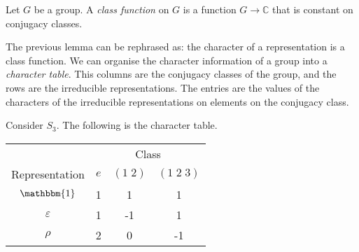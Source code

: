 \begin{definition}
    Let $G$ be a group. A \emph{class function} on $G$ is a function $G \to \mathbb C$ that is constant on conjugacy classes.
\end{definition}

The previous lemma can be rephrased as: the character of a representation is a class function. We can organise the character information of a group into a \emph{character table}. This columns are the conjugacy classes of the group, and the rows are the irreducible representations. The entries are the values of the characters of the irreducible representations on elements on the conjugacy class.

\begin{example}
    Consider $S_3$. The following is the character table.
    \begin{center}
        \begin{tabular}{cccc}
            \toprule
                           & \multicolumn{3}{c}{Class}                          \\
            \cmidrule{2-4}
            Representation & $e$                       & $(1\;2)$ & $(1\;2\;3)$ \\
            \midrule
            $\mathbbm{1}$  & 1                         & 1        & 1           \\
            $\varepsilon$  & 1                         & -1       & 1           \\
            $\rho$         & 2                         & 0        & -1          \\
            \bottomrule
        \end{tabular}
    \end{center}
\end{example}
